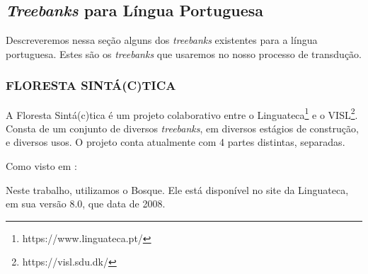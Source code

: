 \subsection{\textit{Treebanks} para Língua Portuguesa}
\label{sec:tbPortugues}
Descreveremos nessa seção alguns dos \textit{treebanks} existentes para a língua portuguesa. Estes são os \textit{treebanks} que usaremos no nosso processo de transdução.

\subsubsection{FLORESTA SINTÁ(C)TICA}
\label{subsec:florestasintatica}

A Floresta Sintá(c)tica é um projeto colaborativo entre o Linguateca\footnote{https://www.linguateca.pt/} e o VISL\footnote{https://visl.sdu.dk/}. Consta de um conjunto de diversos \textit{treebanks}, em diversos estágios de construção, e diversos usos. O projeto conta atualmente com 4 partes distintas, separadas.

Como visto em \cite{linguatecaFloresta}:
\begin{quote}
\end{quote}

Neste trabalho, utilizamos o Bosque. Ele está disponível no site da Linguateca, em sua versão 8.0, que data de 2008. 

